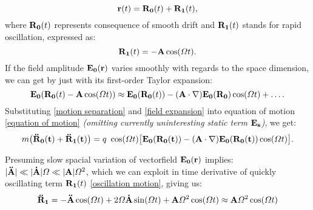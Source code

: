 \begin{equation}
	\label{motion separation}
	\vb{r}(t) = \vb{R_0}(t) + \vb{R_1}(t),
\end{equation}
where $\vb{R_0}(t)$ represents consequence of smooth drift and $\vb{R_1}(t)$ stands for rapid oscillation, expressed as:
\begin{equation}
	\label{oscillation motion}
	\vb{R_1}(t) = - \vb{A} \cos(\Omega t).
\end{equation}
If the field amplitude $\vb{E_0}(\vb{r})$
 varies smoothly with regards to the space dimension, we can get by just with its first-order Taylor expansion:
\begin{equation}
	\label{field expansion}
	\vb{E_0}(\vb{R_0}(t) - \vb{A} \cos(\Omega t)) \approx \vb{E_0}(\vb{R_0}(t)) -(\vb{A} \cdot \nabla) \vb{E_0}(\vb{R_0}) \cos(\Omega t) + \dots.
\end{equation}
Substituting \eqref{motion separation} and \eqref{field expansion} into equation of motion \eqref{equation of motion} \textit{(omitting currently uninteresting static term $\vb{E_s}$)}, we get:
\begin{equation}
	m \big( \vb{\ddot{R}_0(t)} + \vb{\ddot{R}_1(t)} \big) = q \ \cos(\Omega t) \big[ \vb{E_0(\vb{R_0}(t))} - (\vb{A} \cdot \nabla) \vb{E_0(\vb{R_0}(t))} \cos(\Omega t)  \big].
\end{equation}

Presuming slow spacial variation of vectorfield $\vb{E_0}(\vb{r})$ implies: \\ $|\vb{\ddot{A}}| \ll |\vb{\dot{A}}| \Omega \ll |\vb{A}| \Omega^2$, which we can exploit in time derivative of quickly oscillating term $\vb{R_1}(t)$ \eqref{oscillation motion}, giving us:
\begin{equation}
	\vb{\ddot{R}_1} = - \vb{\ddot{A}} \cos(\Omega t) + 2 \Omega \vb{\dot{A}} \sin(\Omega t) + \vb{A} \Omega^2 \cos(\Omega t) \approx \vb{A} \Omega^2 \cos(\Omega t)
\end{equation}

